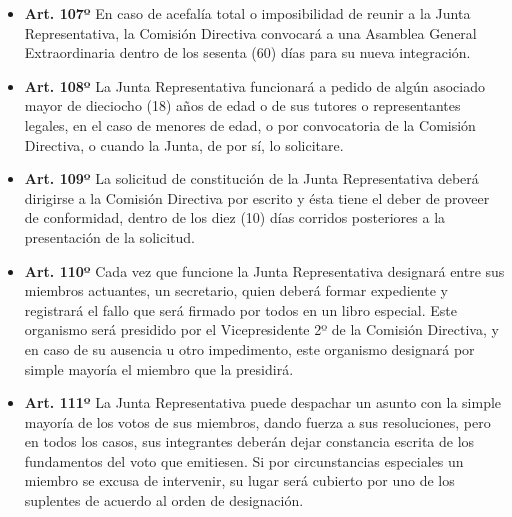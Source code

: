 \documentclass[]{book}
\providecommand{\tightlist}{%
  \setlength{\itemsep}{0pt}\setlength{\parskip}{0pt}}
\begin{document}
\begin{itemize}
\tightlist
\item
  \textbf{Art. 107º} En caso de acefalía total o imposibilidad de reunir
  a la Junta Representativa, la Comisión Directiva convocará a una
  Asamblea General Extraordinaria dentro de los sesenta (60) días para
  su nueva integración.
\end{itemize}

\begin{itemize}
\tightlist
\item
  \textbf{Art. 108º} La Junta Representativa funcionará a pedido de
  algún asociado mayor de dieciocho (18) años de edad o de sus tutores o
  representantes legales, en el caso de menores de edad, o por
  convocatoria de la Comisión Directiva, o cuando la Junta, de por sí,
  lo solicitare.
\end{itemize}

\begin{itemize}
\tightlist
\item
  \textbf{Art. 109º} La solicitud de constitución de la Junta
  Representativa deberá dirigirse a la Comisión Directiva por escrito y
  ésta tiene el deber de proveer de conformidad, dentro de los diez (10)
  días corridos posteriores a la presentación de la solicitud.
\end{itemize}

\begin{itemize}
\tightlist
\item
  \textbf{Art. 110º} Cada vez que funcione la Junta Representativa
  designará entre sus miembros actuantes, un secretario, quien deberá
  formar expediente y registrará el fallo que será firmado por todos en
  un libro especial. Este organismo será presidido por el Vicepresidente
  2º de la Comisión Directiva, y en caso de su ausencia u otro
  impedimento, este organismo designará por simple mayoría el miembro
  que la presidirá.
\end{itemize}

\begin{itemize}
\tightlist
\item
  \textbf{Art. 111º} La Junta Representativa puede despachar un asunto
  con la simple mayoría de los votos de sus miembros, dando fuerza a sus
  resoluciones, pero en todos los casos, sus integrantes deberán dejar
  constancia escrita de los fundamentos del voto que emitiesen. Si por
  circunstancias especiales un miembro se excusa de intervenir, su lugar
  será cubierto por uno de los suplentes de acuerdo al orden de
  designación.
\end{itemize}
\end{document}

